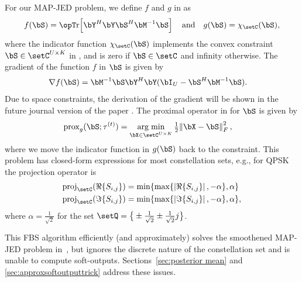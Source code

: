 For our MAP-JED problem, we define $f$ and $g$ in  as 
\begin{align}
	f(\bS) = \Tr\!\left[\bY^H\bY\bS^H \bM^{-1}\bS\right] \quad \text{and} \quad 
	g(\bS)=  \chi_{\setC}(\bS),
\end{align}
where the indicator function $\chi_{\setC}(\bS)$
implements the convex constraint $\bS\in\setC^{U\times K}$ in , 
and is zero if $\bS\in\setC$ and infinity otherwise. 
%
The gradient of the function $f$ in $\bS$ is given by  
%
\begin{align}\label{eq:nabla f}
	\nabla f(\bS) &= \bM^{-1}\bS\bY^H\bY (\bI_{U}-\bS^H\bM^{-1}\bS).
\end{align}
%
Due to space constraints, the derivation of the gradient will be shown in the future journal version of the paper \cite{songSJEDfuture}.
%
The proximal operator in  for $\bS$ is given by 
\begin{align}
&\text{prox}_{g}(\bS;\tau^{(t)})  
%
= \argmin_{\bX\in\setC^{U\times K}} \textstyle \frac{1}{2}\normfro{\bX-\bS}^2, \label{eq: NC proximal S}
\end{align}
where we move the indicator function in $g(\bS)$ back to the constraint. 
%
This problem has closed-form expressions for most constellation sets, e.g., for QPSK the projection operator is 
%
\begin{align}\label{eq:inf proximal}
\text{proj} _\setC(\Re\{S_{i,j}\}) &= \min\{\max\{\abs{\Re\{S_{i,j}\}},-\alpha\},\alpha\}\\
\text{proj} _\setC(\Im\{S_{i,j}\}) &= \min\{\max\{\abs{\Im\{S_{i,j}\}},-\alpha\},\alpha\},
\end{align}
where $ \alpha =\frac{1}{\sqrt{2}}$ for the set $\setQ=\big\{\pm\frac{1}{\sqrt{2}}\pm \frac{1}{\sqrt{2}}j\big\}$.

This FBS algorithm efficiently (and approximately) solves the smoothened MAP-JED problem in~, but 
ignores the discrete nature of the constellation set and is unable to compute soft-outputs. Sections~\ref{sec:posterior mean} and \ref{sec:approxsoftoutputtrick} address these issues. 

